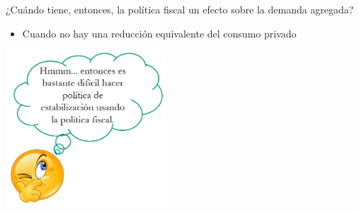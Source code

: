 \documentclass{beamer}
\begin{document}
\begin{frame}{¿Cuándo tiene, entonces, la política fiscal un efecto sobre la demanda agregada?}

    \begin{itemize}
    \item Cuando no hay una reducción equivalente del consumo privado
    \end{itemize}
     \vspace{3mm}
    
    \centering\includegraphics[width=6cm]{Slides Principios de Economia/P95b.png}\

\end{frame}

\end{document}
